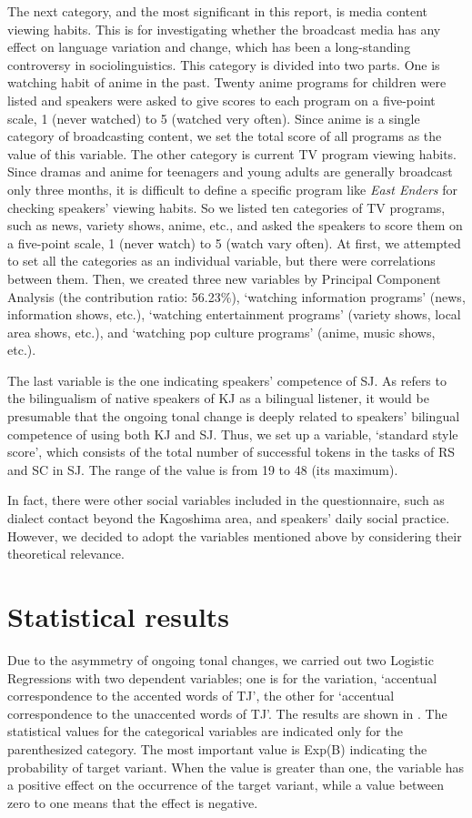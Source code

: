 \documentclass[output=paper]{LSP/langsci}
\begin{document}
The next category, and the most significant in this report, is media content viewing habits. This is for investigating whether the broadcast media has any effect on language variation and change, which has been a long-standing controversy in sociolinguistics. This category is divided into two parts. One is watching habit of anime in the past. Twenty anime programs for children were listed and speakers were asked to give scores to each program on a five-point scale, 1 (never watched) to 5 (watched very often). Since anime is a single category of broadcasting content, we set the total score of all programs as the value of this variable. The other category is current TV program viewing habits. Since dramas and anime for teenagers and young adults are generally broadcast only three months, it is difficult to define a specific program like \textit{East Enders} for checking speakers’ viewing habits. So we listed ten categories of TV programs, such as news, variety shows, anime, etc., and asked the speakers to score them on a five-point scale, 1 (never watch) to 5 (watch vary often). At first, we attempted to set all the categories as an individual variable, but there were correlations between them. Then, we created three new variables by Principal Component Analysis (the contribution ratio: 56.23\%), ‘watching information programs’ (news, information shows, etc.), ‘watching entertainment programs’ (variety shows, local area shows, etc.), and ‘watching pop culture programs’ (anime, music shows, etc.).  

The last variable is the one indicating speakers’ competence of SJ. As \citet[324]{kubozono_tonal_2007} refers to the bilingualism of native speakers of KJ as a bilingual listener, it would be presumable that the ongoing tonal change is deeply related to speakers’ bilingual competence of using both KJ and SJ. Thus, we set up a variable, ‘standard style score’, which consists of the total number of successful tokens in the tasks of RS and SC in SJ. The range of the value is from 19 to 48 (its maximum).

In fact, there were other social variables included in the questionnaire, such as dialect contact beyond the Kagoshima area, and speakers’ daily social practice. However, we decided to adopt the variables mentioned above by considering their theoretical relevance. 

\section{Statistical results}
Due to the asymmetry of ongoing tonal changes, we carried out two Logistic Regressions with two dependent variables; one is for the variation, ‘accentual correspondence to the accented words of TJ’, the other for ‘accentual correspondence to the unaccented words of TJ’. The results are shown in . The statistical values for the categorical variables are indicated only for the parenthesized category. The most important value is Exp(B) indicating the probability of target variant. When the value is greater than one, the variable has a positive effect on the occurrence of the target variant, while  a value between zero to one means that the effect is negative.
\end{document}
